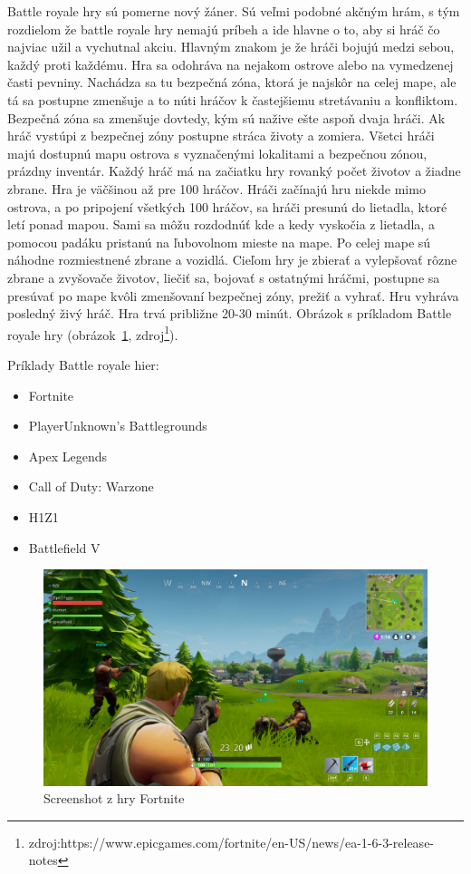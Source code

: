 \documentclass[10pt,oneside,slovak,a4paper]{article}
\begin{document}
Battle royale hry sú pomerne nový žáner. Sú veľmi podobné akčným hrám, s tým rozdielom že battle royale hry nemajú príbeh a ide hlavne o to, aby si hráč čo najviac užil a vychutnal akciu. Hlavným znakom je že hráči bojujú medzi sebou, každý proti každému. Hra sa odohráva na nejakom ostrove alebo na vymedzenej časti pevniny. Nachádza sa tu bezpečná zóna, ktorá je najskôr na celej mape, ale tá sa postupne zmenšuje a to núti hráčov k častejšiemu stretávaniu a konfliktom. Bezpečná zóna sa zmenšuje dovtedy, kým sú nažive ešte aspoň dvaja hráči. Ak hráč vystúpi z bezpečnej zóny postupne stráca životy a zomiera. Všetci hráči majú dostupnú mapu ostrova s vyznačenými lokalitami a bezpečnou zónou, prázdny inventár. Každý hráč má na začiatku hry rovanký počet životov a žiadne zbrane. Hra je väčšinou až pre 100 hráčov. Hráči začínajú hru niekde mimo ostrova, a po pripojení všetkých 100 hráčov, sa hráči presunú do lietadla, ktoré letí ponad mapou. Sami sa môžu rozdodnúť kde a kedy vyskočia z lietadla, a pomocou padáku pristanú na ľubovolnom mieste na mape. Po celej mape sú náhodne rozmiestnené zbrane a vozidlá. Cieľom hry je zbierať a vylepšovať rôzne zbrane a zvyšovače životov, liečiť sa, bojovať s ostatnými hráčmi, postupne sa presúvať po mape kvôli zmenšovaní bezpečnej zóny, prežiť a vyhrať. Hru vyhráva posledný živý hráč. Hra trvá približne 20-30 minút. Obrázok s príkladom Battle royale hry (obrázok~\ref{f:fortnite}, zdroj\footnote{zdroj:https://www.epicgames.com/fortnite/en-US/news/ea-1-6-3-release-notes}).

Príklady Battle royale hier:
\begin{itemize}
\item Fortnite
\item PlayerUnknown's Battlegrounds
\item Apex Legends
\item Call of Duty: Warzone
\item H1Z1
\item Battlefield V
\end{itemize}

\begin{figure}[h]
\centering
\includegraphics[scale=0.10]{fortnite.jpg}
\caption{Screenshot z hry Fortnite}
\label{f:fortnite}
\end{figure}
\end{document}
